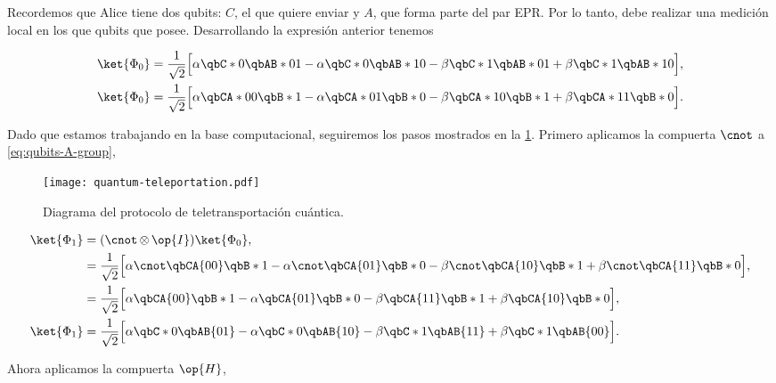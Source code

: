 \documentclass[./../main.tex]{subfiles}
\begin{document}
    Recordemos que Alice tiene dos qubits: \(C\), el que quiere enviar y \(A\), que forma parte del par EPR. Por lo tanto, debe realizar una medición local en los que qubits que posee. Desarrollando la expresión anterior tenemos

    \begin{align}
        \ket{\Phi_{0}} &= \dfrac{1}{\sqrt{2}}\Bigl[\alpha\qbC*{0}\qbAB*{01} - \alpha\qbC*{0}\qbAB*{10} - \beta\qbC*{1}\qbAB*{01} + \beta\qbC*{1}\qbAB*{10}\Bigr],\nonumber\\
        \ket{\Phi_{0}} &= \dfrac{1}{\sqrt{2}}\Bigl[\alpha\qbCA*{00}\qbB*{1} - \alpha\qbCA*{01}\qbB*{0} - \beta\qbCA*{10}\qbB*{1} + \beta\qbCA*{11}\qbB*{0}\Bigr].\label{eq:qubits-A-group}
    \end{align}

    Dado que estamos trabajando en la base computacional, seguiremos los pasos mostrados en la \cref{fig:quantum-teleportation}. Primero aplicamos la compuerta \(\cnot\) a \cref{eq:qubits-A-group},

    \begin{figure}[htb]
        \centering
        \texttt{[image: quantum-teleportation.pdf]}
        \caption{Diagrama del protocolo de teletransportación cuántica.}
        \label{fig:quantum-teleportation}
    \end{figure}

    \begin{align}
        \ket{\Phi_{1}} &= (\tensprod{\cnot}{\op{I}})\ket{\Phi_{0}},\nonumber\\
        &= \dfrac{1}{\sqrt{2}}\Bigl[\alpha\cnot\qbCA{00}\qbB*{1} - \alpha\cnot\qbCA{01}\qbB*{0} - \beta\cnot\qbCA{10}\qbB*{1} + \beta\cnot\qbCA{11}\qbB*{0}\Bigr],\nonumber\\
        &= \dfrac{1}{\sqrt{2}}\Bigl[\alpha\qbCA{00}\qbB*{1} - \alpha\qbCA{01}\qbB*{0} - \beta\qbCA{11}\qbB*{1} + \beta\qbCA{10}\qbB*{0}\Bigr],\nonumber\\
        \ket{\Phi_{1}} &= \dfrac{1}{\sqrt{2}}\Bigl[\alpha\qbC*{0}\qbAB{01} - \alpha\qbC*{0}\qbAB{10} - \beta\qbC*{1}\qbAB{11} + \beta\qbC*{1}\qbAB{00}\Bigr].\label{eq:phi_1}
    \end{align}

    Ahora aplicamos la compuerta \(\op{H}\),
\end{document}
